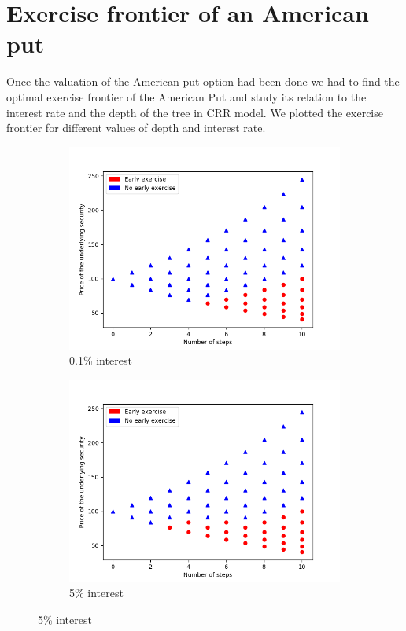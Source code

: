 \documentclass[12pt]{report}
\begin{document}
\section*{Exercise frontier of an American put}
Once the valuation of the American put option had been done we had to find the optimal exercise frontier of the American Put and study its relation to the interest rate and the depth of the tree in CRR model. We plotted the exercise frontier for different values of depth and interest rate.
\begin{small}
\begin{figure}[H]
	\begin{subfigure}{.5\textwidth}
		\centering
		\includegraphics[width=.8\linewidth]{plots/n_10_r_001.png}  
		\caption{0.1\% interest}
		\label{fig1:sub-first}
	\end{subfigure}
	\begin{subfigure}{.5\textwidth}
		\centering
		\includegraphics[width=.8\linewidth]{plots/n_10_r_005.png}  
		\caption{5\% interest}
		\label{fig1:sub-second}
	\end{subfigure}
	

\end{figure}
\end{small}
\end{document}
